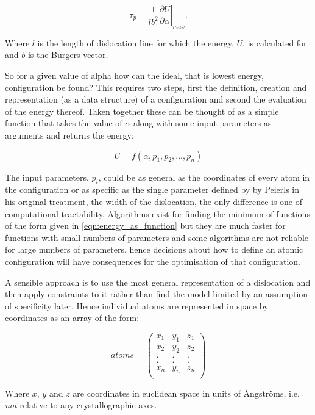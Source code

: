\begin{equation}
\tau_p = \frac{1}{lb^2}   \left. \frac{\partial U}{\partial \alpha} \right|_{max} .
\end{equation}

Where $l$ is the length of dislocation line for which the energy, $U$, is calculated for and $b$ is the Burgers vector.

So for a given value of alpha how can the ideal, that is lowest energy, configuration be found? This requires two steps, first the definition, creation and representation (as a data structure) of a configuration and second the evaluation of the energy thereof.
Taken together these can be thought of as a simple function that takes the value of $\alpha$ along with some input parameters as arguments and returns the energy:

\begin{equation}
U = f(\alpha, p_1, p_2,...,p_n )
\label{eqn:energy_as_function}
\end{equation}

The input parameters, $p_i$, could be as general as the coordinates of every atom in the configuration or as specific as the single parameter defined by by Peierls in his original treatment, the width of the dislocation, the only difference is one of computational tractability. Algorithms exist for finding the minimum of functions of the form given in \autoref{eqn:energy_as_function} but they are much faster for functions with small numbers of parameters and some algorithms are not reliable for large numbers of parameters, hence decisions about how to define an atomic configuration will have consequences for the optimisation of that configuration.

A sensible approach is to use the most general representation of a dislocation and then apply constraints to it rather than find the model limited by an assumption of specificity later. Hence individual atoms are represented in space by coordinates as an array of the form:

$$ atoms = \begin{pmatrix}
x_1 & y_1 & z_1  \\
x_2 & y_2 & z_2  \\
.   &.    &.     \\
.   &.    &.     \\
x_n & y_n & z_n  \\
\end{pmatrix}
$$

Where $x$, $y$ and $z$ are coordinates in euclidean space in units of \r{A}ngstr\"{o}ms, i.e. \emph{not} relative to any crystallographic axes.

